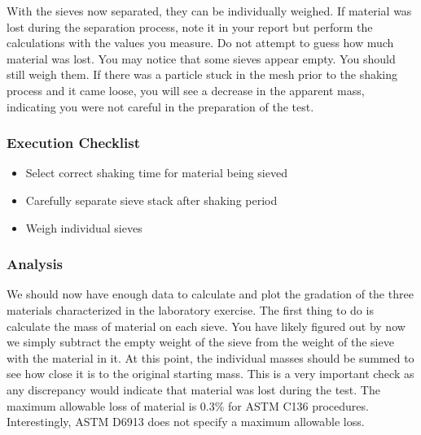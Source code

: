 \documentclass[12pt]{article}
\begin{document}
With the sieves now separated, they can be individually weighed. If material was lost during the separation process, note it in your report but perform the calculations with the values you measure. Do not attempt to guess how much material was lost. You may notice that some sieves appear empty. You should still weigh them. If there was a particle stuck in the mesh prior to the shaking process and it came loose, you will see a decrease in the apparent mass, indicating you were not careful in the preparation of the test.

\subsubsection*{Execution Checklist}
\begin{itemize}
    \item Select correct shaking time for material being sieved
    \item Carefully separate sieve stack after shaking period
    \item Weigh individual sieves
\end{itemize}

\subsubsection{Analysis}
We should now have enough data to calculate and plot the gradation of the three materials characterized in the laboratory exercise. The first thing to do is calculate the mass of material on each sieve. You have likely figured out by now we simply subtract the empty weight of the sieve from the weight of the sieve with the material in it. At this point, the individual masses should be summed to see how close it is to the original starting mass. This is a very important check as any discrepancy would indicate that material was lost during the test. The maximum allowable loss of material is 0.3\% for ASTM C136 procedures. Interestingly, ASTM D6913 does not specify a maximum allowable loss.
\end{document}
